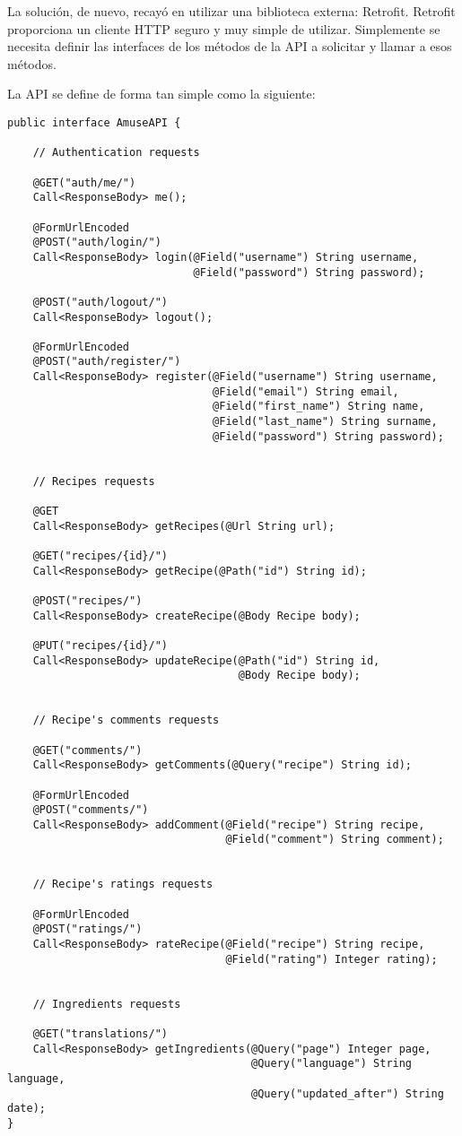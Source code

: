 La solución, de nuevo, recayó en utilizar una biblioteca externa:
Retrofit.\cite{retrofit-book} Retrofit proporciona un cliente HTTP seguro y muy
simple de utilizar. Simplemente se necesita definir las interfaces de los
métodos de la API a solicitar y llamar a esos métodos.

La API se define de forma tan simple como la siguiente:

\begin{verbatim}
public interface AmuseAPI {

    // Authentication requests

    @GET("auth/me/")
    Call<ResponseBody> me();

    @FormUrlEncoded
    @POST("auth/login/")
    Call<ResponseBody> login(@Field("username") String username,
                             @Field("password") String password);

    @POST("auth/logout/")
    Call<ResponseBody> logout();

    @FormUrlEncoded
    @POST("auth/register/")
    Call<ResponseBody> register(@Field("username") String username,
                                @Field("email") String email,
                                @Field("first_name") String name,
                                @Field("last_name") String surname,
                                @Field("password") String password);


    // Recipes requests

    @GET
    Call<ResponseBody> getRecipes(@Url String url);

    @GET("recipes/{id}/")
    Call<ResponseBody> getRecipe(@Path("id") String id);

    @POST("recipes/")
    Call<ResponseBody> createRecipe(@Body Recipe body);

    @PUT("recipes/{id}/")
    Call<ResponseBody> updateRecipe(@Path("id") String id,
                                    @Body Recipe body);


    // Recipe's comments requests

    @GET("comments/")
    Call<ResponseBody> getComments(@Query("recipe") String id);

    @FormUrlEncoded
    @POST("comments/")
    Call<ResponseBody> addComment(@Field("recipe") String recipe,
                                  @Field("comment") String comment);


    // Recipe's ratings requests

    @FormUrlEncoded
    @POST("ratings/")
    Call<ResponseBody> rateRecipe(@Field("recipe") String recipe,
                                  @Field("rating") Integer rating);


    // Ingredients requests

    @GET("translations/")
    Call<ResponseBody> getIngredients(@Query("page") Integer page,
                                      @Query("language") String language,
                                      @Query("updated_after") String date);
}
\end{verbatim}

